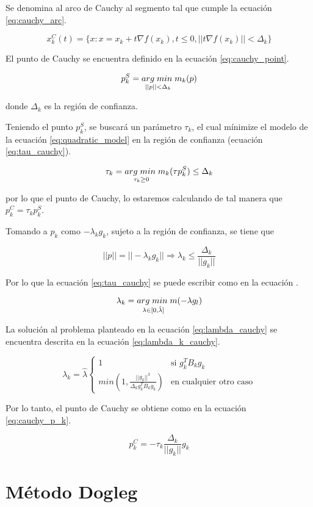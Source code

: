 Se denomina al arco de Cauchy al segmento tal que cumple la ecuación \ref{eq:cauchy_arc}.

\begin{equation}
    x_k^C(t) = \{x: x=x_k + t\nabla f(x_k), t\leq 0, ||t\nabla f(x_k)|| < \Delta_k \}
    \label{eq:cauchy_arc}
\end{equation}

El punto de Cauchy se encuentra definido en la ecuación \ref{eq:cauchy_point}.

\begin{equation}
    p_k^S = \underset{||p||<\Delta_k}{arg\; min\;} m_k(p) \label{eq:cauchy_point}
\end{equation}

donde $\Delta_k$ es la región de confianza.

Teniendo el punto $p_k^S$, se buscará un parámetro $\tau_k$, el cual mínimize el modelo de la ecuación \ref*{eq:quadratic_model} en la región de confianza (ecuación \ref{eq:tau_cauchy}).

\begin{equation}
    \tau_k = \underset{\tau_k \geq 0}{arg\; min\;} m_k(\tau p_k^S) \leq \Delta_k \label{eq:tau_cauchy}
\end{equation}

por lo que el punto de Cauchy, lo estaremos calculando de tal manera que $p_k^C = \tau_k p_k^S$.

Tomando a $p_k$ como $-\lambda_k g_k$, sujeto a la región de confianza, se tiene que

\begin{equation*}
    ||p|| = ||-\lambda_k g_k|| \Rightarrow \lambda_k \leq \frac{\Delta_k}{||g_k||}
\end{equation*}


Por lo que la ecuación \ref{eq:tau_cauchy} se puede escribir como en la ecuación .

\begin{equation}
    \lambda_k = \underset{\lambda \in [0,\hat{\lambda}]}{arg\; min\;}  m(-\lambda g_l) \label{eq:lambda_cauchy}
\end{equation}

La solución al problema planteado en la ecuación \ref{eq:lambda_cauchy} se encuentra descrita en la ecuación \ref{eq:lambda_k_cauchy}.

\begin{equation}
    \lambda_k = \hat{\lambda} \left\{\begin{matrix}
        1                                                            & \text{si } g^T_k B_k g_k      \\
        min\left(1, \frac{||g_k||^3}{\Delta_k g_k^T B_k g_k} \right) & \text{en cualquier otro caso}
    \end{matrix}\right. \label{eq:lambda_k_cauchy}
\end{equation}

Por lo tanto, el punto de Cauchy se obtiene como en la ecuación \ref{eq:cauchy_p_k}.

\begin{equation}
    p_k^C = -\tau_k \frac{\Delta_k}{||g_k||} g_k \label{eq:cauchy_p_k}
\end{equation}

\section{Método Dogleg}